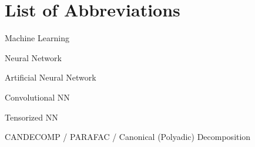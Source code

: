 \section{List of Abbreviations}

\begin{description}[leftmargin=!,labelwidth=2cm]
    \item [ML] Machine Learning
    \item [NN] Neural Network
    \item [ANN] Artificial Neural Network
    \item [CNN] Convolutional NN
    \item [TNN] Tensorized NN
    \item [CP] CANDECOMP / PARAFAC / Canonical (Polyadic) Decomposition

\end{description}